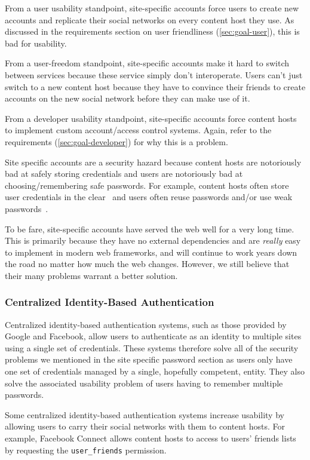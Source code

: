 \documentclass[pdftex,12pt,a4papaer,twoside,notitlepage]{report}
\begin{document}
From a user usability standpoint, site-specific accounts force users to create
new accounts and replicate their social networks on every content host they use.
As discussed in the requirements section on user friendliness (\cref{sec:goal-user}), this is bad for usability.

From a user-freedom standpoint, site-specific accounts make it hard to switch
between services because these service simply don't interoperate. Users can't
just switch to a new content host because they have to convince their friends to
create accounts on the new social network before they can make use of it.

From a developer usability standpoint, site-specific accounts force content
hosts to implement custom account/access control systems. Again, refer to the
requirements (\cref{sec:goal-developer}) for why this is a problem.

Site specific accounts are a security hazard because content hosts are
notoriously bad at safely storing credentials and users are notoriously bad at
choosing/remembering safe passwords. For example, content hosts often store user
credentials in the clear~\cite{plaintext} and users often reuse passwords and/or
use weak passwords~\cite{ms-passwords}.

To be fare, site-specific accounts have served the web well for a very long
time. This is primarily because they have no external dependencies and are
\emph{really} easy to implement in modern web frameworks, and will continue to
work years down the road no matter how much the web changes. However, we still
believe that their many problems warrant a better solution.

\subsubsection{Centralized Identity-Based Authentication}

Centralized identity-based authentication systems, such as those provided by
Google and Facebook, allow users to authenticate as an identity to multiple
sites using a single set of credentials. These systems therefore solve all of
the security problems we mentioned in the site specific password section as
users only have one set of credentials managed by a single, hopefully competent,
entity. They also solve the associated usability problem of users having to
remember multiple passwords.

Some centralized identity-based authentication systems increase usability by
allowing users to carry their social networks with them to content hosts. For
example, Facebook Connect allows content hosts to access to users' friends lists
by requesting the \verb=user_friends=
permission\cite{facebook-connect-user-friends}.
\end{document}
